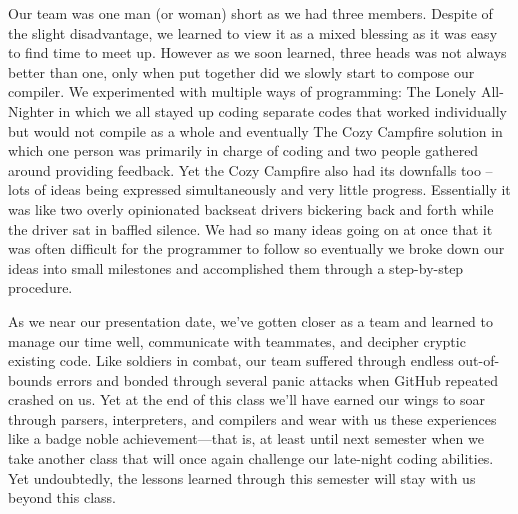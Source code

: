 \documentclass[11pt]{report}
\begin{document}
Our team was one man (or woman) short as we had three members. Despite of the slight disadvantage, we learned to view it as a mixed blessing as it was easy to find time to meet up. However as we soon learned, three heads was not always better than one, only when put together did we slowly start to compose our compiler. We experimented with multiple ways of programming: The Lonely All-Nighter in which we all stayed up coding separate codes that worked individually but would not compile as a whole and eventually The Cozy Campfire solution in which one person was primarily in charge of coding and two people gathered around providing feedback. Yet the Cozy Campfire also had its downfalls too – lots of ideas being expressed simultaneously and very little progress. Essentially it was like two overly opinionated backseat drivers bickering back and forth while the driver sat in baffled silence. We had so many ideas going on at once that it was often difficult for the programmer to follow so eventually we broke down our ideas into small milestones and accomplished them through a step-by-step procedure.

As we near our presentation date, we’ve gotten closer as a team and learned to manage our time well, communicate with teammates, and decipher cryptic existing code. Like soldiers in combat, our team suffered through endless out-of-bounds errors and bonded through several panic attacks when GitHub repeated crashed on us. Yet at the end of this class we’ll have earned our wings to soar through parsers, interpreters, and compilers and wear with us these experiences like a badge noble achievement—that is, at least until next semester when we take another class that will once again challenge our late-night coding abilities. Yet undoubtedly, the lessons learned through this semester will stay with us beyond this class.
\end{document}
